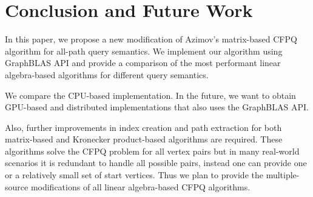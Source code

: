 \section{Conclusion and Future Work}
In this paper, we propose a new modification of Azimov's matrix-based CFPQ algorithm for all-path query semantics. We implement our algorithm using GraphBLAS API and provide a comparison of the most performant linear algebra-based algorithms for different query semantics. %

We compare the CPU-based implementation. In the future, we want to obtain GPU-based and distributed implementations that also uses the GraphBLAS API.

Also, further improvements in index creation and path extraction for both matrix-based and Kronecker product-based algorithms are required. These algorithms solve the CFPQ problem for all vertex pairs but in many real-world scenarios it is redundant to handle all possible pairs, instead one can provide one or a relatively small set of start vertices. Thus we plan to provide the multiple-source modifications of all linear algebra-based CFPQ algorithms.